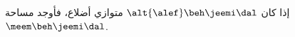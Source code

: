 \begin{question}
\begin{instance}
\begin{mcq}[standalone=true]
\begin{stem}
إذا كان $\alt{\alef}\beh\jeemi\dal$ متوازي أضلاع، فأوجد مساحة $\meem\beh\jeemi\dal$.\par
{}
\end{stem}
\begin{distractors}

\end{distractors}

\end{mcq}

\end{instance}

\end{question}

